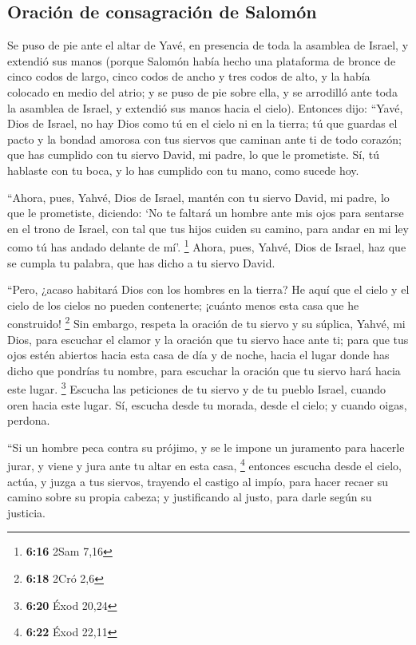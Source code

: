 \begin{paracol}{2}
\hypertarget{oraciuxf3n-de-consagraciuxf3n-de-salomuxf3n}{%
\subsection{Oración de consagración de
Salomón}\label{oraciuxf3n-de-consagraciuxf3n-de-salomuxf3n}}

 Se puso de pie ante el altar de Yavé, en presencia de
toda la asamblea de Israel, y extendió sus manos  (porque
Salomón había hecho una plataforma de bronce de cinco codos de largo,
cinco codos de ancho y tres codos de alto, y la había colocado en medio
del atrio; y se puso de pie sobre ella, y se arrodilló ante toda la
asamblea de Israel, y extendió sus manos hacia el cielo).
 Entonces dijo: ``Yavé, Dios de Israel, no hay Dios como
tú en el cielo ni en la tierra; tú que guardas el pacto y la bondad
amorosa con tus siervos que caminan ante ti de todo corazón;
 que has cumplido con tu siervo David, mi padre, lo que
le prometiste. Sí, tú hablaste con tu boca, y lo has cumplido con tu
mano, como sucede hoy.

 ``Ahora, pues, Yahvé, Dios de Israel, mantén con tu
siervo David, mi padre, lo que le prometiste, diciendo: `No te faltará
un hombre ante mis ojos para sentarse en el trono de Israel, con tal que
tus hijos cuiden su camino, para andar en mi ley como tú has andado
delante de mí'. \footnote{\textbf{6:16} 2Sam 7,16} 
Ahora, pues, Yahvé, Dios de Israel, haz que se cumpla tu palabra, que
has dicho a tu siervo David.

 ``Pero, ¿acaso habitará Dios con los hombres en la
tierra? He aquí que el cielo y el cielo de los cielos no pueden
contenerte; ¡cuánto menos esta casa que he construido! \footnote{\textbf{6:18}
  2Cró 2,6}  Sin embargo, respeta la oración de tu siervo
y su súplica, Yahvé, mi Dios, para escuchar el clamor y la oración que
tu siervo hace ante ti;  para que tus ojos estén abiertos
hacia esta casa de día y de noche, hacia el lugar donde has dicho que
pondrías tu nombre, para escuchar la oración que tu siervo hará hacia
este lugar. \footnote{\textbf{6:20} Éxod 20,24}  Escucha
las peticiones de tu siervo y de tu pueblo Israel, cuando oren hacia
este lugar. Sí, escucha desde tu morada, desde el cielo; y cuando oigas,
perdona.

 ``Si un hombre peca contra su prójimo, y se le impone un
juramento para hacerle jurar, y viene y jura ante tu altar en esta casa,
\footnote{\textbf{6:22} Éxod 22,11}  entonces escucha
desde el cielo, actúa, y juzga a tus siervos, trayendo el castigo al
impío, para hacer recaer su camino sobre su propia cabeza; y
justificando al justo, para darle según su justicia.


\end{paracol}
